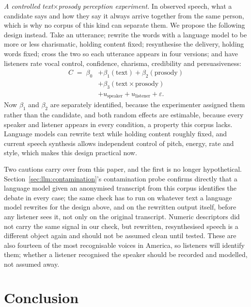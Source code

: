 \documentclass[journal]{IEEEtran}
\begin{document}
\emph{A controlled text$\times$prosody perception experiment.} In observed
speech, what a candidate says and how they say it always arrive together
from the same person, which is why no corpus of this kind can separate
them. We propose the following design instead. Take an utterance; rewrite
the words with a language model to be more or less charismatic, holding
content fixed; resynthesise the delivery, holding words fixed; cross the two
so each utterance appears in four versions; and have listeners rate vocal
control, confidence, charisma, credibility and persuasiveness:
\begin{equation}
\begin{split}
C \;=\; \beta_0 &+ \beta_1(\text{text}) + \beta_2(\text{prosody}) \\
                &+ \beta_3(\text{text} \times \text{prosody}) \\
                &+ u_{\text{speaker}} + u_{\text{listener}} + \varepsilon .
\end{split}
\label{eq:factorial}
\end{equation}
Now $\beta_1$ and $\beta_2$ are separately identified, because the
experimenter assigned them rather than the candidate, and both random
effects are estimable, because every speaker and listener appears in every
condition, a property this corpus lacks. Language models can rewrite text
while holding content roughly fixed, and current speech synthesis allows
independent control of pitch, energy, rate and style, which makes this
design practical now.

Two cautions carry over from this paper, and the first is no longer
hypothetical. Section~\ref{sec:llm:contamination}'s contamination probe
confirms directly that a language model given an anonymised transcript from
this corpus identifies the debate in every case; the same check has to run
on whatever text a language model rewrites for the design above, and on the
rewritten output itself, before any listener sees it, not only on the
original transcript. Numeric descriptors did not carry the same signal in
our check, but rewritten, resynthesised speech is a different object again
and should not be assumed clean until tested. These are also fourteen of
the most recognisable voices in America, so listeners will identify them;
whether a listener recognised the speaker should be recorded and modelled,
not assumed away.

\section{Conclusion}
\label{sec:concl}
\end{document}

